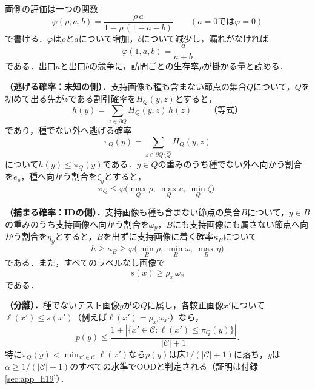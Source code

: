 両側の評価は一つの関数
\begin{equation}
\varphi(\rho,a,b)=\frac{\rho\,a}{1-\rho\,(1-a-b)}\qquad(a=0\text{では}\varphi=0)
\label{eq:phi}
\end{equation}
で書ける．$\varphi$は$\rho$と$a$について増加，$b$について減少し，漏れがなければ
\begin{equation*}
\varphi(1,a,b)=\frac{a}{a+b}
\end{equation*}
である．出口$a$と出口$b$の競争に，訪問ごとの生存率$\rho$が掛かる量と読める．

\appblock
\textbf{\TEscape（逃げる確率：未知の側）．}支持画像も種も含まない節点の集合$Q$について，$Q$を初めて出る先が$z$である割引確率を$H_Q(y,z)$とすると，
\begin{equation*}
h(y)=\sum_{z\in\partial Q}H_Q(y,z)\,h(z)\qquad\text{（等式）}
\end{equation*}
であり，種でない外へ逃げる確率
\begin{equation*}
\pi_Q(y)=\sum_{z\in\partial Q\setminus\hat{Q}}H_Q(y,z)
\end{equation*}
について$h(y)\le\pi_Q(y)$である．$y\in Q$の重みのうち種でない外へ向かう割合を$e_y$，種へ向かう割合を$\zeta_y$とすると，
\begin{equation*}
\pi_Q\le\varphi\big(\max_Q\rho,\ \max_Qe,\ \min_Q\zeta\big).
\end{equation*}

\appblock
\textbf{\TCapture（捕まる確率：IDの側）．}支持画像も種も含まない節点の集合$B$について，$y\in B$の重みのうち支持画像へ向かう割合を$\omega_y$，$B$にも支持画像にも属さない節点へ向かう割合を$\eta_y$とすると，$B$を出ずに支持画像に着く確率$\kappa_B$について
\begin{equation*}
h\ge\kappa_B\ge\varphi\big(\min_B\rho,\ \min_B\omega,\ \max_B\eta\big)
\end{equation*}
である．また，すべてのラベルなし画像で
\begin{equation*}
s(x)\ge\rho_x\,\omega_x
\end{equation*}
である．

\appblock
\textbf{\CSep（分離）．}種でないテスト画像$y$が\TEscape{}の$Q$に属し，各較正画像$x'$について$\ell(x')\le s(x')$（例えば$\ell(x')=\rho_{x'}\omega_{x'}$）なら，
\begin{equation}
p(y)\le\frac{1+|\{x'\in\mathcal{C}:\ell(x')\le\pi_Q(y)\}|}{|\mathcal{C}|+1}.
\label{eq:sep}
\end{equation}
特に$\pi_Q(y)<\min_{x'\in\mathcal{C}}\ell(x')$なら$p(y)$は床$1/(|\mathcal{C}|+1)$に落ち，$y$は$\alpha\ge1/(|\mathcal{C}|+1)$のすべての水準でOODと判定される（証明は付録\ref{sec:app_h19}）．

